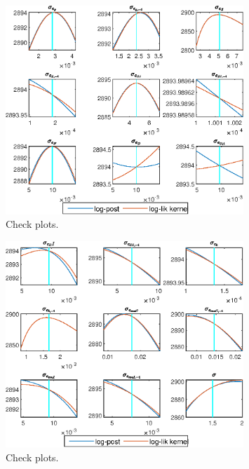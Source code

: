  
\begin{figure}[H]
\centering 
\includegraphics[width=0.80\textwidth]{BRS_aggregate/graphs/BRS_aggregate_CheckPlots1}
\caption{Check plots.}\label{Fig:CheckPlots:1}
\end{figure}
 
\begin{figure}[H]
\centering 
\includegraphics[width=0.80\textwidth]{BRS_aggregate/graphs/BRS_aggregate_CheckPlots2}
\caption{Check plots.}\label{Fig:CheckPlots:2}
\end{figure}
 
